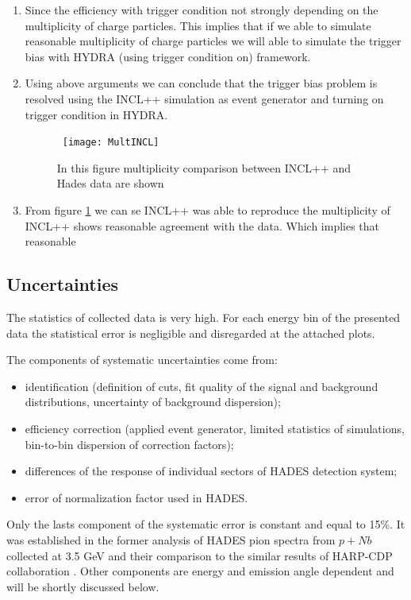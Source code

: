 \begin{enumerate}[label=\roman*)]
    \item Since the efficiency with trigger condition not strongly depending on the multiplicity of charge particles. This implies that if we able to simulate reasonable multiplicity of charge particles we will able to simulate the trigger bias with HYDRA (using trigger condition on) framework.
    \item Using above arguments we can conclude that the trigger bias problem is resolved using the INCL++ simulation  as event generator and turning on trigger condition in HYDRA.
    \begin{figure}
	\centering\
	\texttt{[image: MultINCL]}
	\caption{In this figure multiplicity comparison between INCL++ and Hades data are shown }
	\label{MultINCL}
    \end{figure}
    \item From figure \ref{MultINCL} we can se INCL++ was able to reproduce the multiplicity of INCL++ shows reasonable agreement with the data. Which implies that reasonable  
\end{enumerate}
\subsection{\label{Uncertainties} Uncertainties}

The statistics of collected data is very high. For each energy bin of the presented data the statistical error 
is negligible and disregarded at the attached plots.

The components of systematic uncertainties come from: 
\begin{itemize}
	\item identification (definition of cuts, fit quality of the signal and background distributions, 
	uncertainty of background dispersion); 
	\item efficiency correction (applied event generator, limited statistics of simulations, bin-to-bin 
	dispersion of correction factors);
	\item differences of the response of individual sectors of HADES detection system;
	\item error of normalization factor used in HADES.  
\end{itemize}

Only the lasts component of the systematic error is constant and equal to 15\%. It was established in the former analysis 
of HADES pion spectra from $p+Nb$ collected at 3.5 GeV \cite{AgakishievPionP} and their comparison 
to the similar results of HARP-CDP collaboration \cite{Tlusty}. Other components are energy 
and emission angle dependent and will be shortly discussed below.  

